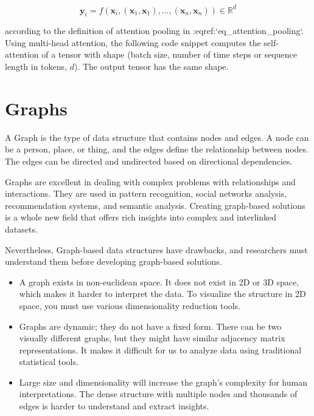 $$\mathbf{y}_i = f(\mathbf{x}_i, (\mathbf{x}_1, \mathbf{x}_1), \ldots, (\mathbf{x}_n, \mathbf{x}_n)) \in \mathbb{R}^d$$

according to the definition of attention pooling in
:eqref:`eq_attention_pooling`.
Using multi-head attention,
the following code snippet
computes the self-attention of a tensor
with shape (batch size, number of time steps or sequence length in tokens, $d$).
The output tensor has the same shape.

\section{Graphs}
\label{sec:3_graphs}


A Graph is the type of data structure that contains nodes and edges. A node can be a person, place, or thing, and the edges define the relationship between nodes. The edges can be directed and undirected based on directional dependencies. 

Graphs are excellent in dealing with complex problems with relationships and interactions. They are used in pattern recognition, social networks analysis, recommendation systems, and semantic analysis. Creating graph-based solutions is a whole new field that offers rich insights into complex and interlinked datasets. 

Nevertheless, Graph-based data structures have drawbacks, and researchers must understand them before developing graph-based solutions.

\begin{itemize}
	\item A graph exists in non-euclidean space. It does not exist in 2D or 3D space, which makes it harder to interpret the data. To visualize the structure in 2D space, you must use various dimensionality reduction tools.
	\item Graphs are dynamic; they do not have a fixed form. There can be two visually different graphs, but they might have similar adjacency matrix representations. It makes it difficult for us to analyze data using traditional statistical tools.
	\item Large size and dimensionality will increase the graph's complexity for human interpretations. The dense structure with multiple nodes and thousands of edges is harder to understand and extract insights. 
\end{itemize}

